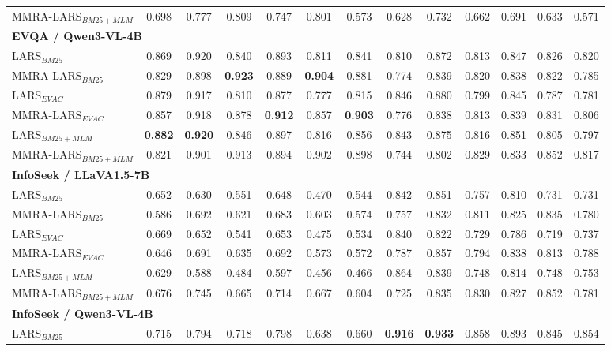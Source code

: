 \begin{table}[t]
\begin{tabular}{l|cccccc|cccccc}
MMRA-LARS$_{BM25+MLM}$ & 0.698 & 0.777 & 0.809 & 0.747 & 0.801 & 0.573 & 0.628 & 0.732 & 0.662 & 0.691 & 0.633 & 0.571 \\
\multicolumn{13}{l}{\hspace{0.3em}\textbf{EVQA / Qwen3-VL-4B}} \\
LARS$_{BM25}$ & 0.869 & 0.920 & 0.840 & 0.893 & 0.811 & 0.841 & 0.810 & 0.872 & 0.813 & 0.847 & 0.826 & 0.820 \\
MMRA-LARS$_{BM25}$ & 0.829 & 0.898 & \textbf{0.923} & 0.889 & \textbf{0.904} & 0.881 & 0.774 & 0.839 & 0.820 & 0.838 & 0.822 & 0.785 \\
LARS$_{EVAC}$ & 0.879 & 0.917 & 0.810 & 0.877 & 0.777 & 0.815 & 0.846 & 0.880 & 0.799 & 0.845 & 0.787 & 0.781 \\
MMRA-LARS$_{EVAC}$ & 0.857 & 0.918 & 0.878 & \textbf{0.912} & 0.857 & \textbf{0.903} & 0.776 & 0.838 & 0.813 & 0.839 & 0.831 & 0.806 \\
LARS$_{BM25+MLM}$ & \textbf{0.882} & \textbf{0.920} & 0.846 & 0.897 & 0.816 & 0.856 & 0.843 & 0.875 & 0.816 & 0.851 & 0.805 & 0.797 \\
MMRA-LARS$_{BM25+MLM}$ & 0.821 & 0.901 & 0.913 & 0.894 & 0.902 & 0.898 & 0.744 & 0.802 & 0.829 & 0.833 & 0.852 & 0.817 \\
\multicolumn{13}{l}{\hspace{0.3em}\textbf{InfoSeek / LLaVA1.5-7B}} \\
LARS$_{BM25}$ & 0.652 & 0.630 & 0.551 & 0.648 & 0.470 & 0.544 & 0.842 & 0.851 & 0.757 & 0.810 & 0.731 & 0.731 \\
MMRA-LARS$_{BM25}$ & 0.586 & 0.692 & 0.621 & 0.683 & 0.603 & 0.574 & 0.757 & 0.832 & 0.811 & 0.825 & 0.835 & 0.780 \\
LARS$_{EVAC}$ & 0.669 & 0.652 & 0.541 & 0.653 & 0.475 & 0.534 & 0.840 & 0.822 & 0.729 & 0.786 & 0.719 & 0.737 \\
MMRA-LARS$_{EVAC}$ & 0.646 & 0.691 & 0.635 & 0.692 & 0.573 & 0.572 & 0.787 & 0.857 & 0.794 & 0.838 & 0.813 & 0.788 \\
LARS$_{BM25+MLM}$ & 0.629 & 0.588 & 0.484 & 0.597 & 0.456 & 0.466 & 0.864 & 0.839 & 0.748 & 0.814 & 0.748 & 0.753 \\
MMRA-LARS$_{BM25+MLM}$ & 0.676 & 0.745 & 0.665 & 0.714 & 0.667 & 0.604 & 0.725 & 0.835 & 0.830 & 0.827 & 0.852 & 0.781 \\
\multicolumn{13}{l}{\hspace{0.3em}\textbf{InfoSeek / Qwen3-VL-4B}} \\
LARS$_{BM25}$ & 0.715 & 0.794 & 0.718 & 0.798 & 0.638 & 0.660 & \textbf{0.916} & \textbf{0.933} & 0.858 & 0.893 & 0.845 & 0.854 \\

\end{tabular}
\end{table}
